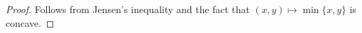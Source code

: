 \documentclass{article}
\let\temp\phi
\let\phi\varphi
\let\varphi\temp
\let\temp\varepsilon
\let\varepsilon\temp
\newcommand{\E}{\mathbb{E}}
\theoremstyle{plain}
\newtheorem{lemma}[theorem]{Lemma}
\theoremstyle{definition}
\theoremstyle{remark}
\begin{document}









\begin{proof}
    Follows from Jensen's inequality and the fact that $(x,y)\mapsto \min\{x,y\}$ is concave.
\end{proof}
\end{document}
